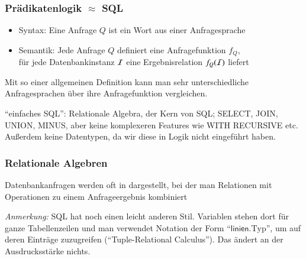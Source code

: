 \documentclass[aspectratio=1610,onlymath]{beamer}
\begin{document}
\begin{frame}\frametitle{Prädikatenlogik $\approx$ SQL}

\begin{itemize}
\item Syntax: Eine Anfrage $Q$ ist ein Wort aus einer Anfragesprache
\item Semantik: Jede Anfrage $Q$ definiert eine Anfragefunktion $f_Q$, \\ für jede Datenbankinstanz $\mathcal{I}$ eine Ergebnisrelation $f_Q(\mathcal{I})$ liefert
\end{itemize}\pause

\pause

Mit so einer allgemeinen Definition kann man sehr unterschiedliche Anfragesprachen über ihre Anfragefunktion vergleichen.
\smallskip


\tiny "`einfaches SQL"': Relationale Algebra, der Kern von SQL; SELECT, JOIN, UNION, MINUS, aber keine komplexeren Features wie WITH RECURSIVE etc. Außerdem keine Datentypen, da wir diese in Logik nicht eingeführt haben.

\end{frame}

\begin{frame}\frametitle{Relationale Algebren}

Datenbankanfragen werden oft in  dargestellt,
bei der man Relationen mit Operationen zu einem Anfrageergebnis kombiniert
\bigskip

\medskip

\emph{Anmerkung:} SQL hat noch einen leicht anderen Stil. Variablen stehen dort für ganze Tabellenzeilen und man verwendet Notation der Form "`$\textsf{linien}.\text{Typ}$"', um auf deren Einträge zuzugreifen ("`Tuple-Relational Calculus"'). Das ändert an der Ausdrucksstärke nichts.

\end{frame}
\end{document}

